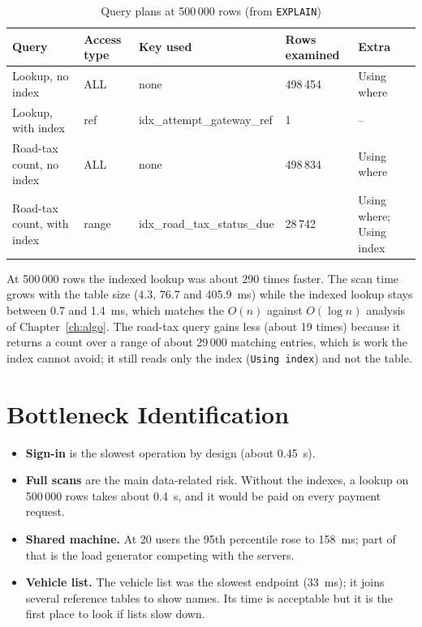 \begin{table}[H]
\centering\small
\caption{Query plans at 500\,000 rows (from \texttt{EXPLAIN})}\label{tab:explain}
\begin{tabularx}{\linewidth}{@{}p{3.5cm}p{2.6cm}p{3.6cm}p{2.3cm}X@{}}
\toprule \textbf{Query} & \textbf{Access type} & \textbf{Key used} & \textbf{Rows examined} & \textbf{Extra}\\ \midrule
Lookup, no index & ALL & none & 498\,454 & Using where\\
Lookup, with index & ref & idx\_attempt\_gateway\_ref & 1 & --\\
Road-tax count, no index & ALL & none & 498\,834 & Using where\\
Road-tax count, with index & range & idx\_road\_tax\_status\_due & 28\,742 & Using where; Using index\\
\bottomrule
\end{tabularx}
\end{table}
At 500\,000 rows the indexed lookup was about 290 times faster. The scan time grows with
the table size (4.3, 76.7 and 405.9~ms) while the indexed lookup stays between 0.7 and 1.4~ms,
which matches the $O(n)$ against $O(\log n)$ analysis of Chapter~\ref{ch:algo}. The
road-tax query gains less (about 19 times) because it returns a count over a range of about
29\,000 matching entries, which is work the index cannot avoid; it still reads only the index
(\texttt{Using index}) and not the table.

\section{Bottleneck Identification}
\begin{itemize}
\item \textbf{Sign-in} is the slowest operation by design (about 0.45~s).
\item \textbf{Full scans} are the main data-related risk. Without the indexes, a lookup on 500\,000 rows takes about 0.4~s, and it would be paid on every payment request.
\item \textbf{Shared machine.} At 20 users the 95th percentile rose to 158~ms; part of that is the load generator competing with the servers.
\item \textbf{Vehicle list.} The vehicle list was the slowest endpoint (33~ms); it joins several reference tables to show names. Its time is acceptable but it is the first place to look if lists slow down.
\end{itemize}


